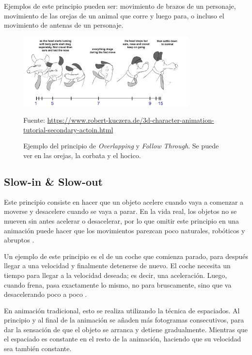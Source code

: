 \documentclass{article}
\begin{document}
\bigskip

Ejemplos de este principio pueden ser: movimiento de brazos de un personaje, movimiento de las orejas de un animal que corre y luego para, o incluso el movimiento de antenas de un personaje.

\begin{figure}[H]
    \centering
    \includegraphics[width=0.8\textwidth]{imagenes/overlap-08.jpg}
    \caption{Ejemplo del principio de \textit{Overlapping} y \textit{Follow Through}. Se puede ver en las orejas, la corbata y el hocico.}
    \vspace{10pt}
    \footnotesize{Fuente: \url{https://www.robert-kuczera.de/3d-character-animation-tutorial-secondary-actoin.html}}
\end{figure}

\subsection{Slow-in \& Slow-out}

Este principio consiste en hacer que un objeto acelere cuando vaya a comenzar a moverse y desacelere cuando se vaya a parar. En la vida real, los objetos no se mueven sin antes acelerar o desacelerar, por lo que omitir este principio en una animación puede hacer que los movimientos parezcan poco naturales, robóticos y abruptos \cite{plural}.

\bigskip

Un ejemplo de este principio es el de un coche que comienza parado, para después llegar a una velocidad y finalmente detenerse de nuevo. El coche necesita un tiempo para llegar a la velocidad deseada; es decir, una aceleración. Luego, cuando frena, pasa exactamente lo mismo, no para bruscamente, sino que va desacelerando poco a poco \cite{plural}.

\bigskip

En animación tradicional, esto se realiza utilizando la técnica de espaciados. Al principio y al final de la animación se añaden más fotogramas consecutivos, para dar la sensación de que el objeto se arranca y detiene gradualmente. Mientras que el espaciado es constante en el resto de la animación, haciendo que su velocidad sea también constante.
\end{document}
